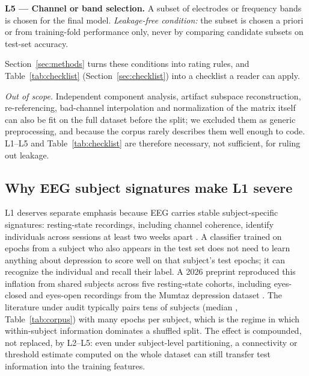 \textbf{L5 --- Channel or band selection.} A subset of electrodes or frequency bands is chosen for the final model. \emph{Leakage-free condition:} the subset is chosen a priori or from training-fold performance only, never by comparing candidate subsets on test-set accuracy.

Section~\ref{sec:methods} turns these conditions into rating rules, and Table~\ref{tab:checklist} (Section~\ref{sec:checklist}) into a checklist a reader can apply.

\emph{Out of scope.} Independent component analysis, artifact subspace reconstruction, re-referencing, bad-channel interpolation and normalization of the matrix itself can also be fit on the full dataset before the split; we excluded them as generic preprocessing, and because the corpus rarely describes them well enough to code. L1--L5 and Table~\ref{tab:checklist} are therefore necessary, not sufficient, for ruling out leakage.

\subsection{Why EEG subject signatures make L1 severe}
L1 deserves separate emphasis because EEG carries stable subject-specific signatures: resting-state recordings, including channel coherence, identify individuals across sessions at least two weeks apart \cite{di2021}. A classifier trained on epochs from a subject who also appears in the test set does not need to learn anything about depression to score well on that subject's test epochs; it can recognize the individual and recall their label. A 2026 preprint reproduced this inflation from shared subjects across five resting-state cohorts, including eyes-closed and eyes-open recordings from the Mumtaz depression dataset \cite{sahuc2026}. The literature under audit typically pairs tens of subjects (median \NsubjMedian{}, Table~\ref{tab:corpus}) with many epochs per subject, which is the regime in which within-subject information dominates a shuffled split. The effect is compounded, not replaced, by L2--L5: even under subject-level partitioning, a connectivity or threshold estimate computed on the whole dataset can still transfer test information into the training features.
